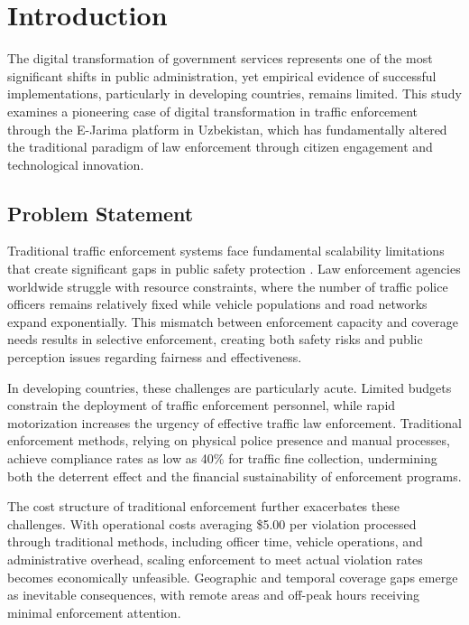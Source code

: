 \documentclass[pdflatex,sn-mathphys-num]{sn-jnl}%
\theoremstyle{thmstyleone}%
\theoremstyle{thmstyletwo}%
\theoremstyle{thmstylethree}%
\begin{document}
\maketitle

\section{Introduction}\label{sec1}

The digital transformation of government services represents one of the most significant shifts in public administration, yet empirical evidence of successful implementations, particularly in developing countries, remains limited. This study examines a pioneering case of digital transformation in traffic enforcement through the E-Jarima platform in Uzbekistan, which has fundamentally altered the traditional paradigm of law enforcement through citizen engagement and technological innovation.

\subsection{Problem Statement}\label{subsec1}

Traditional traffic enforcement systems face fundamental scalability limitations that create significant gaps in public safety protection \cite{bertot2010using}. Law enforcement agencies worldwide struggle with resource constraints, where the number of traffic police officers remains relatively fixed while vehicle populations and road networks expand exponentially. This mismatch between enforcement capacity and coverage needs results in selective enforcement, creating both safety risks and public perception issues regarding fairness and effectiveness.

In developing countries, these challenges are particularly acute. Limited budgets constrain the deployment of traffic enforcement personnel, while rapid motorization increases the urgency of effective traffic law enforcement. Traditional enforcement methods, relying on physical police presence and manual processes, achieve compliance rates as low as 40\% for traffic fine collection, undermining both the deterrent effect and the financial sustainability of enforcement programs.

The cost structure of traditional enforcement further exacerbates these challenges. With operational costs averaging \$5.00 per violation processed through traditional methods, including officer time, vehicle operations, and administrative overhead, scaling enforcement to meet actual violation rates becomes economically unfeasible. Geographic and temporal coverage gaps emerge as inevitable consequences, with remote areas and off-peak hours receiving minimal enforcement attention.
\end{document}
